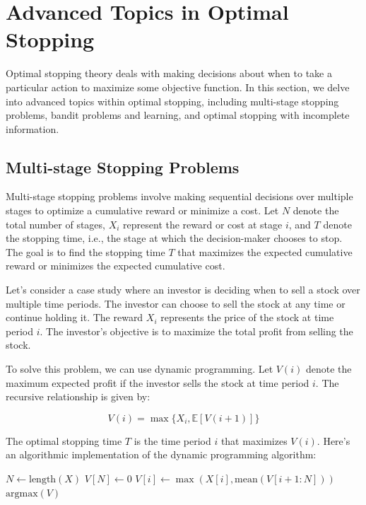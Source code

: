 \documentclass[12pt]{book} %
\begin{document}
\section{Advanced Topics in Optimal Stopping}

Optimal stopping theory deals with making decisions about when to take a particular action to maximize some objective function. In this section, we delve into advanced topics within optimal stopping, including multi-stage stopping problems, bandit problems and learning, and optimal stopping with incomplete information.

\subsection{Multi-stage Stopping Problems}

Multi-stage stopping problems involve making sequential decisions over multiple stages to optimize a cumulative reward or minimize a cost. Let \(N\) denote the total number of stages, \(X_i\) represent the reward or cost at stage \(i\), and \(T\) denote the stopping time, i.e., the stage at which the decision-maker chooses to stop. The goal is to find the stopping time \(T\) that maximizes the expected cumulative reward or minimizes the expected cumulative cost.

Let's consider a case study where an investor is deciding when to sell a stock over multiple time periods. The investor can choose to sell the stock at any time or continue holding it. The reward \(X_i\) represents the price of the stock at time period \(i\). The investor's objective is to maximize the total profit from selling the stock.

To solve this problem, we can use dynamic programming. Let \(V(i)\) denote the maximum expected profit if the investor sells the stock at time period \(i\). The recursive relationship is given by:

\[
V(i) = \max\{X_i, \mathbb{E}[V(i+1)]\}
\]

The optimal stopping time \(T\) is the time period \(i\) that maximizes \(V(i)\). Here's an algorithmic implementation of the dynamic programming algorithm:
\FloatBarrier
\begin{algorithm}
\caption{Multi-stage Stopping Problem}\label{multi_stage}
\begin{algorithmic}[1]
\State $N \gets \text{length}(X)$
\State $V[N] \gets 0$
    \State $V[i] \gets \max(X[i], \text{mean}(V[i+1:N]))$
\EndFor
\State \Return $\text{argmax}(V)$
\EndFunction
\end{algorithmic}
\end{algorithm}
\FloatBarrier
\end{document}
